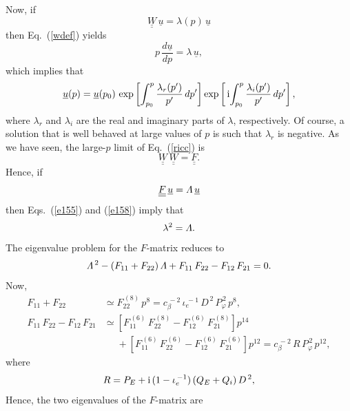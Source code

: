 \documentclass[12pt,prb,aps]{revtex4-1}
\begin{document}
Now, if
\begin{equation}\label{e155}
\underline{\underline{W}}\,\underline{u}= \lambda(p)\,\underline{u}
\end{equation}
then Eq.~(\ref{wdef}) yields
\begin{equation}
p\,\frac{d\underline{u}}{dp} = \lambda\,\underline{u},
\end{equation}
which implies that
\begin{equation}
\underline{u}(p) = \underline{u}(p_0)\,\exp\left[\int_{p_0}^p\frac{\lambda_r(p')}{p'}\,dp'\right]\exp\left[\,{\rm i}\!\int_{p_0}^p\frac{\lambda_i(p')}{p'}\,dp'\right], 
\end{equation}
where $\lambda_r$  and $\lambda_i$ are the real and imaginary parts of $\lambda$, respectively. 
Of course, a solution that is well behaved at large values of $p$ is such that $\lambda_r$ is negative. As we have seen, the large-$p$ limit of
Eq.~(\ref{ricc}) is
\begin{equation}
\underline{\underline{W}}\,\underline{\underline{W}} = \underline{\underline{F}}.
\end{equation}
Hence, if
\begin{equation}\label{e158}
 \underline{\underline{F}}\,\underline{u} = {\mit\Lambda}\,\underline{u}
 \end{equation}
 then Eqs.~(\ref{e155}) and (\ref{e158}) imply that 
 \begin{equation}
 \lambda^2 = {\mit\Lambda}.
 \end{equation}
 The eigenvalue problem for the $F$-matrix reduces to
 \begin{equation}
 {\mit\Lambda}^{\,2}- (F_{11}+ F_{22})\,{\mit\Lambda} + F_{11}\,F_{22} - F_{12}\,F_{21}=0.
 \end{equation}
 Now,
 \begin{align}
 F_{11}+F_{22}&\simeq  F_{22}^{\,(8)}\,p^8 =c_\beta^{\,-2}\, \iota_e^{\,-1}\,D^{\,2}\,P_\varphi^{\,2}\,p^8,\\[0.5ex]
 F_{11}\,F_{22} - F_{12}\,F_{21}&  \simeq \left[F_{11}^{\,(6)}\,F_{22}^{\,(8)} - F_{12}^{\,(6)}\,F_{21}^{\,(8)}\right]p^{14}\nonumber\\[0.5ex]&\phantom{=}+\left[F_{11}^{\,(6)}\,F_{22}^{\,(6)} - F_{12}^{\,(6)}\,F_{21}^{\,(6)}\right]p^{12}
=c_\beta^{\,-2}\,R\,P_\varphi^{\,2}\,p^{12},
 \end{align}
  where 
 \begin{equation}
 R= P_E + {\rm i}\,(1-\iota_e^{\,-1})\,(Q_E+Q_i)\,D^{\,2},
 \end{equation}
Hence, the two eigenvalues of the $F$-matrix are
\end{document}
